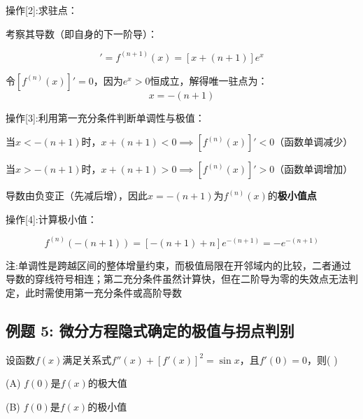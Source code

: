 \documentclass[11pt,a4paper,UTF8]{ctexart}
\begin{document}
操作[2]:求驻点：

\begin{solbox}[分步推导与答题规范]
考察其导数（即自身的下一阶导）：


\begin{equation*}
[f^{(n)}(x)]' = f^{(n+1)}(x) = [x + (n + 1)]e^x
\end{equation*}


令$[f^{(n)}(x)]' = 0$，因为$e^x > 0$恒成立，解得唯一驻点为：
\begin{equation*}
x = -(n + 1)
\end{equation*}


\end{solbox}

操作[3]:利用第一充分条件判断单调性与极值：

\begin{solbox}[分步推导与答题规范]
当$x < -(n + 1)$时，$x + (n + 1) < 0 \implies [f^{(n)}(x)]' < 0$（函数单调减少）

当$x > -(n + 1)$时，$x + (n + 1) > 0 \implies [f^{(n)}(x)]' > 0$（函数单调增加）

导数由负变正（先减后增），因此$x = -(n + 1)$为$f^{(n)}(x)$的\textbf{极小值点}
\end{solbox}

操作[4]:计算极小值：

\begin{solbox}[分步推导与答题规范]

\begin{equation*}
f^{(n)}(-(n + 1)) = [-(n + 1) + n]e^{-(n + 1)} = -e^{-(n + 1)}
\end{equation*}

\end{solbox}

\begin{solbox}[分步推导与答题规范]
注:单调性是跨越区间的整体增量约束，而极值局限在开邻域内的比较，二者通过导数的穿线符号相连；第二充分条件虽然计算快，但在二阶导为零的失效点无法判定，此时需使用第一充分条件或高阶导数
\end{solbox}


\subsection{例题 5: 微分方程隐式确定的极值与拐点判别}

设函数$f(x)$满足关系式$f''(x) + [f'(x)]^2 = \sin x$，且$f'(0) = 0$，则( )

(A) $f(0)$是$f(x)$的极大值

(B) $f(0)$是$f(x)$的极小值
\end{document}
